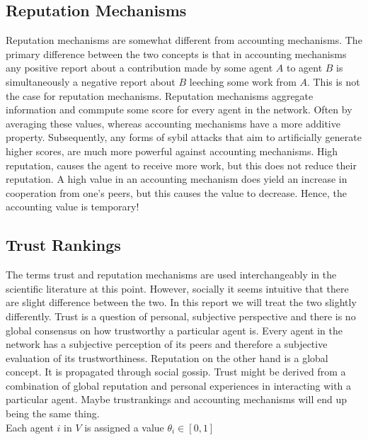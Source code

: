 \documentclass[11pt,a4paper]{article}
\theoremstyle{definition}
\theoremstyle{theorem}
\theoremstyle{proposition}
\theoremstyle{corollary}
\theoremstyle{lemma}
\theoremstyle{example}
\theoremstyle{remark}
\begin{document}
\subsection{Reputation Mechanisms}
\label{subsec:Reputation Mechanisms}
Reputation mechanisms are somewhat different from accounting mechanisms. The primary difference between the two concepts is that in accounting mechanisms any positive report about a contribution made by some agent $A$ to agent $B$ is simultaneously a negative report about $B$ leeching some work from $A$. This is not the case for reputation mechanisms. Reputation mechanisms aggregate information and commpute some score for every agent in the network. Often by averaging these values, whereas accounting mechanisms have a more additive property. Subsequently, any forms of sybil attacks that aim to artificially generate higher scores, are much more powerful against accounting mechanisms. High reputation, causes the agent to receive more work, but this does not reduce their reputation. A high value in an accounting mechanism does yield an increase in cooperation from one's peers, but this causes the value to decrease. Hence, the accounting value is temporary!
\subsection{Trust Rankings}
\label{subsec:Trust Rankings}
The terms trust and reputation mechanisms are used interchangeably in the scientific literature at this point. However, socially it seems intuitive that there are slight difference between the two. In this report we will treat the two slightly differently. Trust is a question of personal, subjective perspective and there is no global consensus on how trustworthy a particular agent is. Every agent in the network has a subjective perception of its peers and therefore a subjective evaluation of its trustworthiness. Reputation on the other hand is a global concept. It is propagated through social gossip. Trust might be derived from a combination of global reputation and personal experiences in interacting with a particular agent. Maybe trustrankings and accounting mechanisms will end up being the same thing.  \vspace{1em}\\

\noindent{} Each agent $i$ in $V$ is assigned a value $\theta_i\in{}[0,1]$ 
\end{document}
